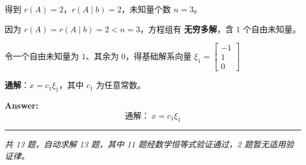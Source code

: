 \documentclass[12pt, a4paper]{article}
\begin{document}
得到 $r(A) = 2$，$r(A\mid b) = 2$，未知量个数 $n = 3$。

因为 $r(A) = r(A\mid b) = 2 < n = 3$，方程组有 \textbf{无穷多解}，含 $1$ 个自由未知量。

令一个自由未知量为 $1$、其余为 $0$，得基础解系向量 $\xi_{1} = \left[\begin{matrix}-1\\1\\0\end{matrix}\right]$

\textbf{通解}：$x = c_{1}\xi_{1}$，其中 $c_1$ 为任意常数。

\textbf{Answer:}
\[\text{通解：}\ x = c_{1}\xi_{1}\]


\vspace{1em}
\hrule
\vspace{1em}

\vspace{2em}
\noindent\textit{共 13 题，自动求解 13 题，其中 11 题经数学恒等式验证通过，2 题暂无适用验证律。}
\end{document}
